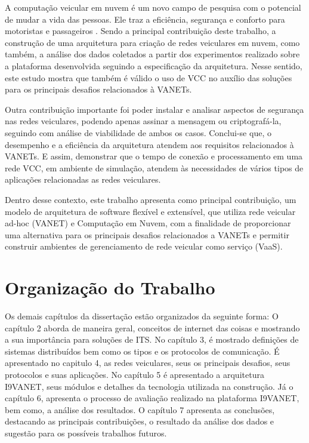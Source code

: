 \documentclass[
	12pt,				%
	oneside,			%
	a4paper,			%
	english,			%
	brazil				%
	]{abntex2ppgsi}
\begin{document}
A computação veicular em nuvem é um novo campo de pesquisa com o potencial de mudar a vida das pessoas. Ele traz a eficiência, segurança e conforto para motoristas e passageiros \cite{falchetti2015vehicular}. Sendo a principal contribuição deste trabalho, a construção de uma arquitetura para criação de redes veiculares em nuvem, como também, a análise dos dados coletados a partir dos experimentos realizado sobre a plataforma desenvolvida seguindo a especificação da arquitetura. Nesse sentido, este estudo mostra que também é válido o uso de VCC no auxílio das soluções para os principais desafios relacionados à VANETs.

Outra contribuição importante foi poder instalar e analisar aspectos de segurança nas redes veiculares, podendo apenas assinar a mensagem ou criptografá-la, seguindo com análise de viabilidade de ambos os casos. Conclui-se que, o desempenho e a eficiência da arquitetura atendem aos requisitos relacionados à VANETs. E assim, demonstrar que o tempo de conexão e processamento em uma rede VCC, em ambiente de simulação, atendem às necessidades de vários tipos de aplicações relacionadas as redes veiculares.

Dentro desse contexto, este trabalho apresenta como principal contribuição, um modelo de arquitetura de software flexível e extensível, que utiliza rede veicular ad-hoc (VANET) e  Computação em Nuvem, com a finalidade de proporcionar uma alternativa para os principais desafios relacionados a VANETs e permitir construir ambientes de gerenciamento de rede veicular como serviço (VaaS).


\section{Organização do Trabalho}
Os demais capítulos da dissertação estão organizados da seguinte forma:
O capítulo 2 aborda de maneira geral, conceitos de internet das coisas e mostrando a sua importância para soluções de ITS. No capítulo 3, é mostrado definições de sistemas distribuídos bem como os tipos e os protocolos de comunicação. É apresentado no capitulo 4, as redes veiculares, seus os principais desafios, seus protocolos  e suas aplicações. No capítulo 5 é apresentado a arquitetura I9VANET, seus módulos e detalhes da tecnologia utilizada na construção. Já o capítulo 6, apresenta o processo de avaliação realizado na plataforma I9VANET, bem como, a análise dos resultados. O capítulo 7 apresenta as conclusões, destacando as principais contribuições, o resultado da análise dos dados e sugestão para os possíveis trabalhos futuros.
\end{document}

